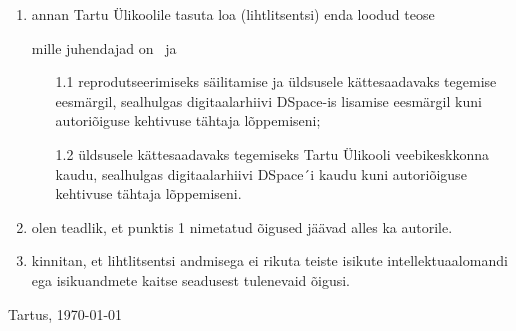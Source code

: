 \begin{appendices}
{{\begin{enumerate}
\item
annan Tartu Ülikoolile tasuta loa (lihtlitsentsi) enda loodud teose

\textbf{\topic}

mille juhendajad on \JuhendajaName\ ja \KaasjuhendajaName

\begin{enumerate}
\item[1.1]
reprodutseerimiseks säilitamise ja üldsusele kättesaadavaks tegemise eesmärgil, sealhulgas digitaalarhiivi DSpace-is lisamise eesmärgil kuni autoriõiguse kehtivuse tähtaja lõppemiseni;
\item[1.2]
üldsusele kättesaadavaks tegemiseks Tartu Ülikooli veebikeskkonna kaudu, sealhulgas digitaalarhiivi DSpace´i kaudu kuni autoriõiguse kehtivuse tähtaja lõppemiseni.
\end{enumerate}


\item
olen teadlik, et punktis 1 nimetatud õigused jäävad alles ka autorile.
\item
kinnitan, et lihtlitsentsi andmisega ei rikuta teiste isikute intellektuaalomandi ega isikuandmete kaitse seadusest tulenevaid õigusi.
\end{enumerate}


Tartus, \today
}}%



\end{appendices}
